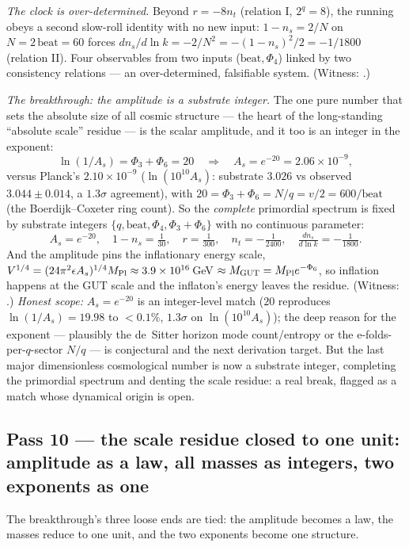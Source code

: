 \documentclass[11pt]{article}
\begin{document}
\emph{The clock is over-determined.} Beyond $r=-8n_t$ (relation I, $2^q=8$), the running
obeys a second slow-roll identity with no new input: $1-n_s=2/N$ on $N=2\,\mathrm{beat}=60$
forces $dn_s/d\ln k=-2/N^2=-(1-n_s)^2/2=-1/1800$ (relation II). Four observables from two
inputs ($\mathrm{beat},\Phi_4$) linked by two consistency relations --- an over-determined,
falsifiable system. (Witness: .)

\emph{The breakthrough: the amplitude is a substrate integer.} The one pure number that
sets the absolute size of all cosmic structure --- the heart of the long-standing
``absolute scale'' residue --- is the scalar amplitude, and it too is an integer in the
exponent:
\[
\ln(1/A_s)=\Phi_3+\Phi_6=20\quad\Longrightarrow\quad A_s=e^{-20}=2.06\times10^{-9},
\]
versus Planck's $2.10\times10^{-9}$ ($\ln(10^{10}A_s)$: substrate $3.026$ vs observed
$3.044\pm0.014$, a $1.3\sigma$ agreement), with $20=\Phi_3+\Phi_6=N/q=v/2=600/\mathrm{beat}$
(the Boerdijk--Coxeter ring count). So the \emph{complete} primordial spectrum is fixed by
substrate integers $\{q,\mathrm{beat},\Phi_4,\Phi_3+\Phi_6\}$ with no continuous parameter:
\[
A_s=e^{-20},\quad 1-n_s=\tfrac1{30},\quad r=\tfrac1{300},\quad n_t=-\tfrac1{2400},\quad
\tfrac{dn_s}{d\ln k}=-\tfrac1{1800}.
\]
And the amplitude pins the inflationary energy scale, $V^{1/4}=(24\pi^2\epsilon A_s)^{1/4}
M_{\rm Pl}\approx3.9\times10^{16}$\,GeV $\approx M_{\rm GUT}=M_{\rm Pl}e^{-\Phi_6}$, so
inflation happens at the GUT scale and the inflaton's energy leaves the residue. (Witness:
.) \emph{Honest scope:} $A_s=e^{-20}$
is an integer-level match ($20$ reproduces $\ln(1/A_s)=19.98$ to $<0.1\%$, $1.3\sigma$ on
$\ln(10^{10}A_s)$); the deep reason for the exponent --- plausibly the de~Sitter horizon
mode count/entropy or the e-folds-per-$q$-sector $N/q$ --- is conjectural and the next
derivation target. But the last major dimensionless cosmological number is now a substrate
integer, completing the primordial spectrum and denting the scale residue: a real break,
flagged as a match whose dynamical origin is open.

\subsection{Pass 10 --- the scale residue closed to one unit: amplitude as a law, all masses as integers, two exponents as one}
\label{sec:capstone-ten}

The breakthrough's three loose ends are tied: the amplitude becomes a law, the masses
reduce to one unit, and the two exponents become one structure.
\end{document}
